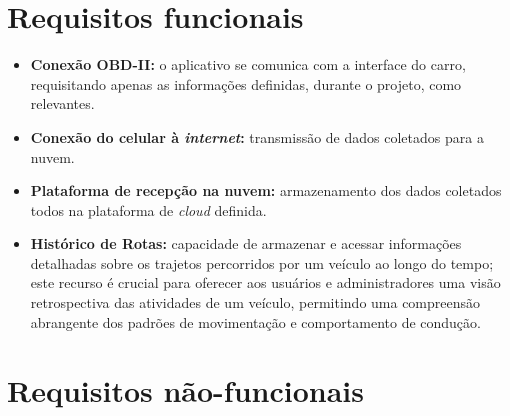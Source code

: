 \section{Requisitos funcionais}
\begin{itemize}
    \item \textbf{Conexão OBD-II:} o aplicativo se comunica com a interface do carro, requisitando apenas as informações definidas, durante o projeto, como relevantes.
    
    \item \textbf{Conexão do celular à \textit{internet}:} transmissão de dados coletados para a nuvem.
    
    \item \textbf{Plataforma de recepção na nuvem:} armazenamento dos dados coletados todos na plataforma de \textit{cloud} definida.
    
    \item \textbf{Histórico de Rotas:} capacidade de armazenar e acessar informações detalhadas sobre os trajetos percorridos por um veículo ao longo do tempo; este recurso é crucial para oferecer aos usuários e administradores uma visão retrospectiva das atividades de um veículo, permitindo uma compreensão abrangente dos padrões de movimentação e comportamento de condução.
\end{itemize}

\section{Requisitos não-funcionais}

